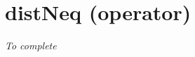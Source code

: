 \section{distNeq (operator)}\label{distneq:distneqoperator}\hypertarget{distneq:distneqoperator}{}

\emph{To complete}